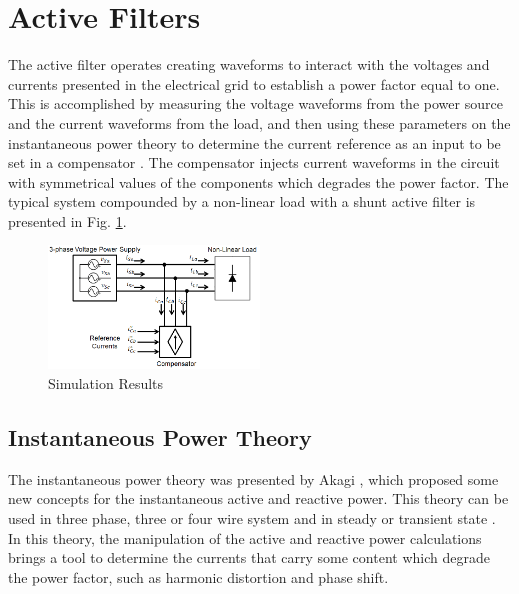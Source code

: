 \section{Active Filters}

The active filter operates creating waveforms to interact with the voltages and currents presented in the electrical grid to establish a power factor equal to one. This is accomplished by measuring the voltage waveforms from the power source and the current waveforms from the load, and then using these parameters on the instantaneous power theory to determine the current reference as an input to be set in a compensator \citep{Akagi2006}. The compensator injects current waveforms in the circuit with symmetrical values of the components which degrades the power factor. The typical system compounded by a non-linear load with a shunt active filter is presented in Fig. \ref{fig:compensador.png}.

\begin{figure}[!h]
\centering
\includegraphics[width=0.5\textwidth]{Figures/compensador.png}
\caption{Simulation Results}
\label{fig:compensador.png}
\end{figure}



\subsection{Instantaneous Power Theory}

The instantaneous power theory was presented by Akagi \citep{Akagi1984}, which proposed some new concepts for the instantaneous active and reactive power. This theory can be used in three phase, three or four wire system and in steady or transient state \citep{Akagi2007}. In this theory, the manipulation of the active and reactive power calculations brings a tool to determine the currents that carry some content which degrade the power factor, such as harmonic distortion and phase shift.

